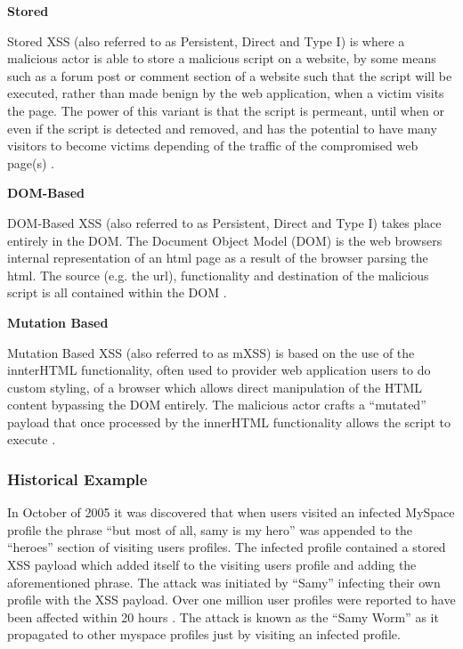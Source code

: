 \documentclass{mscreport}
\begin{document}
\vspace{0.6cm} \noindent
\textbf{Stored}

\vspace{0.2cm} \noindent
Stored XSS (also referred to as Persistent, Direct and Type I) is where a malicious actor is able to store a malicious script on a website, by some means such as a forum post or comment section of a website such that the script will be executed, rather than made benign by the web application, when a victim visits the page. The power of this variant is that the script is permeant, until when or even if the script is detected and removed, and has the potential to have many visitors to become victims depending of the traffic of the compromised web page(s) \cite{Rodriguez2020-bg}.

\vspace{0.6cm} \noindent
\textbf{DOM-Based}


\vspace{0.2cm} \noindent
DOM-Based XSS (also referred to as Persistent, Direct and Type I) takes place entirely in the DOM. The Document Object Model (DOM) is the web browsers internal representation of an html page as a result of the browser parsing the html. The source (e.g. the url), functionality and destination of the malicious script is all contained within the DOM \cite{Rodriguez2020-bg,Klein2005-hx}.

\vspace{0.6cm} \noindent
\textbf{Mutation Based}

\vspace{0.2cm} \noindent
Mutation Based XSS (also referred to as mXSS) is based on the use of the innterHTML functionality, often used to provider web application users to do custom styling, of a browser which allows direct manipulation of the HTML content bypassing the DOM entirely. The malicious actor crafts a “mutated” payload that once processed by the innerHTML functionality allows the script to execute \cite{Heiderich2013-qv}.

\subsubsection{Historical Example}
In October of 2005 it was discovered that when users visited an infected MySpace profile the phrase “but most of all, samy is my hero” was appended to the “heroes” section of visiting users profiles. The infected profile contained a stored XSS payload which added itself to the visiting users profile and adding the aforementioned phrase. The attack was initiated by “Samy” infecting their own profile with the XSS payload. Over one million user profiles were reported to have been affected within 20 hours \cite{Lee2019-xf}.
The attack is known as the “Samy Worm” as it propagated to other myspace profiles just by visiting an infected profile.
\end{document}
